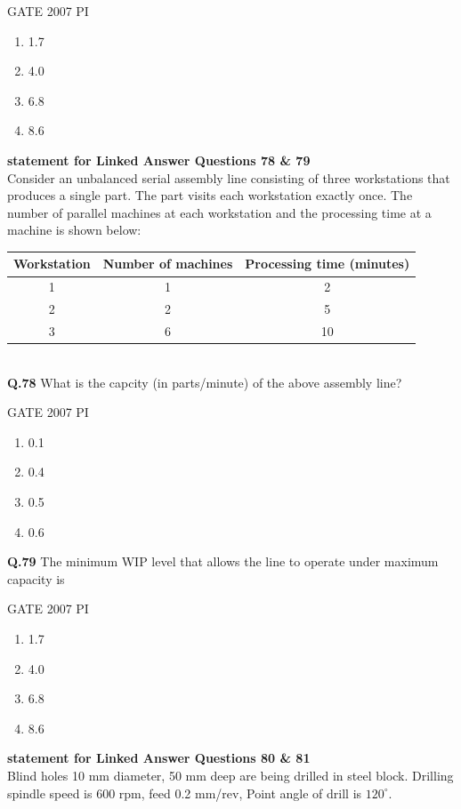 \documentclass[journal,12pt,onecolumn]{exam}
\theoremstyle{remark}
\begin{document}
    \hfill{GATE 2007 PI}
    \begin{enumerate}
        \item 1.7
        \item 4.0
        \item 6.8
        \item 8.6
        \end{enumerate}
        \textbf{statement for Linked Answer Questions 78 \& 79}\\
        Consider an unbalanced serial assembly line consisting of three workstations that produces a single part. 
The part visits each workstation exactly once. 
The number of parallel machines at each workstation and the processing time at a machine is shown below:

\begin{center}
\begin{tabular}{|c|c|c|}
\hline
\textbf{Workstation} & \textbf{Number of machines} & \textbf{Processing time (minutes)} \\ \hline
1 & 1 & 2 \\ \hline
2 & 2 & 5 \\ \hline
3 & 6 & 10 \\ \hline
\end{tabular}
\end{center}\\

\noindent
\textbf{Q.78}
What is the capcity (in parts/minute) of the above assembly line?

\hfill{GATE 2007 PI}
\begin{enumerate}
    \item 0.1
    \item 0.4
    \item 0.5
    \item 0.6
\end{enumerate}
\noindent
\textbf{Q.79}
The minimum WIP level that allows the line to operate under maximum capacity is 

\hfill{GATE 2007 PI}
\begin{enumerate}
    \item 1.7
    \item 4.0
    \item 6.8
    \item 8.6
    \end{enumerate}
    \textbf{statement for Linked Answer Questions 80 \& 81}\\
    
    Blind holes 10 mm diameter, 50 mm deep are being drilled in steel block. Drilling spindle speed is 600 rpm, feed 0.2 mm/rev, Point angle of drill is $120^{\circ}$.\\
    
\end{document}
